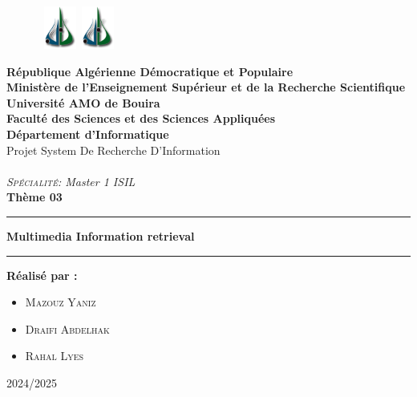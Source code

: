 \begin{titlepage}

  \begin{figure}[htbp]
   \hbox{
       \includegraphics[width=40px]{logo.png}
       \hspace*{12.5cm}
       \includegraphics[width=40px]{logo.png}
    }
  \end{figure}
  
  \vspace {-1.8cm}
  
  \begin{center}
  {\bf R\'{e}publique Alg\'{e}rienne D\'emocratique et Populaire\\
  Minist\`{e}re de l'Enseignement Sup\'{e}rieur et de la
  Recherche Scientifique} \vspace{0.2cm}\\
  
  {\bf {\large Universit\'{e} AMO de Bouira}}\\
  
  {\bf Facult\'{e} des Sciences et des Sciences Appliquées} \\
  
  { \textbf{D\'epartement d'Informatique}}\\ \vspace{0.8cm}
  \Huge{\large{Projet System De Recherche D'Information}} \\ \\\vspace{0.3cm}
  \large{\emph{\textsc{Spécialité:} Master 1 ISIL}}\\ \vspace{0.8cm}
  \huge{\textbf{Thème 03}}\\ %
  \noindent\rule{\textwidth}{1mm}
  \Large{\textbf{ Multimedia Information retrieval}}
  \noindent\rule{\textwidth}{1mm}
  \end{center}
  \vspace{0.3cm}
\begin{center}
  \textbf{Réalisé par :}\\
  \begin{itemize}
    \item \textsc{Mazouz Yaniz} 
    \item \textsc{Draifi Abdelhak} 
    \item \textsc{Rahal Lyes}
  \end{itemize}
\end{center}
  \vspace{2.5cm}
  \begin{center}
  2024/2025
  \end{center}
  
  \end{titlepage}